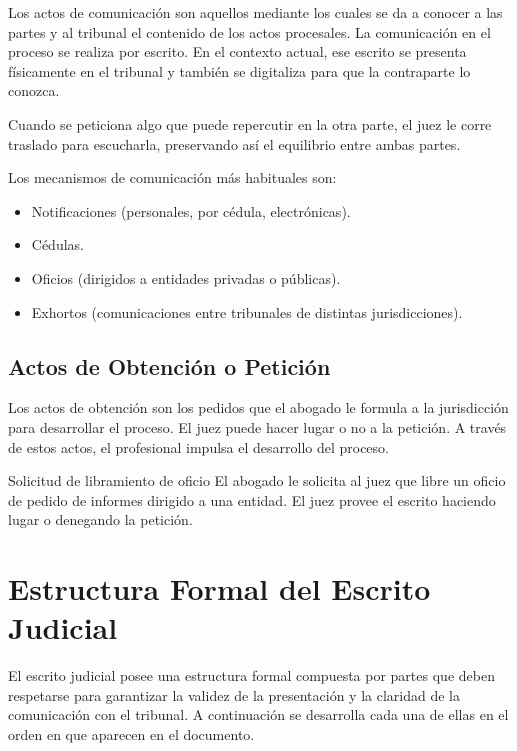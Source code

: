 \documentclass[12pt,oneside]{book}
\begin{document}
Los actos de comunicación son aquellos mediante los cuales se da a conocer a las partes y al tribunal el contenido de los actos procesales. La comunicación en el proceso se realiza por escrito. En el contexto actual, ese escrito se presenta físicamente en el tribunal y también se digitaliza para que la contraparte lo conozca.

Cuando se peticiona algo que puede repercutir en la otra parte, el juez le corre traslado para escucharla, preservando así el equilibrio entre ambas partes.

Los mecanismos de comunicación más habituales son:

\begin{itemize}
    \item Notificaciones (personales, por cédula, electrónicas).
    \item Cédulas.
    \item Oficios (dirigidos a entidades privadas o públicas).
    \item Exhortos (comunicaciones entre tribunales de distintas jurisdicciones).
\end{itemize}

\section{Actos de Obtención o Petición}

Los actos de obtención son los pedidos que el abogado le formula a la jurisdicción para desarrollar el proceso. El juez puede hacer lugar o no a la petición. A través de estos actos, el profesional impulsa el desarrollo del proceso.

\begin{example}{Solicitud de libramiento de oficio}
El abogado le solicita al juez que libre un oficio de pedido de informes dirigido a una entidad. El juez provee el escrito haciendo lugar o denegando la petición.
\end{example}

\chapter{Estructura Formal del Escrito Judicial}

El escrito judicial posee una estructura formal compuesta por partes que deben respetarse para garantizar la validez de la presentación y la claridad de la comunicación con el tribunal. A continuación se desarrolla cada una de ellas en el orden en que aparecen en el documento.
\end{document}
